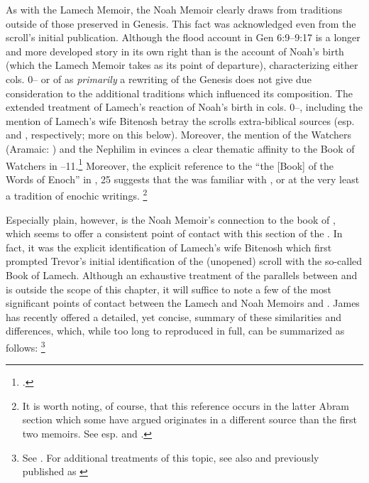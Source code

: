 As with the Lamech Memoir, the Noah Memoir clearly draws from traditions outside of those preserved in Genesis. This fact was acknowledged even from the scroll's initial publication.\autocite[38]{avigad-yadin1956} Although the flood account in Gen 6:9--9:17 is a longer and more developed story in its own right than is the account of Noah's birth (which the Lamech Memoir takes as its point of departure), characterizing either cols. 0-- or  of \ga as \emph{primarily} a rewriting of the Genesis does not give due consideration to the additional traditions which influenced its composition. The extended treatment of Lamech's reaction of Noah's birth in cols. 0--, including the mention of Lamech's wife Bitenosh betray the scrolls extra-biblical sources (esp. \firstenoch and \jub, respectively; more on this below). Moreover, the mention of the Watchers (Aramaic: ) and the Nephilim in  evinces a clear thematic affinity to the Book of Watchers in --11.\footnote{\cite[174]{nickelsburg2005}.} Moreover, the explicit reference to the ``the [Book] of the Words of Enoch'' in , 25 suggests that the \ga was familiar with \firstenoch, or at the very least a tradition of enochic writings.%
%
\footnote{It is worth noting, of course, that this reference occurs in the latter Abram section which some have argued originates in a different source than the first two memoirs. See esp. \cite{bernstein_berthelot-etal2010} and \cite{bernstein_as2010}.}

Especially plain, however, is the Noah Memoir's connection to the book of \jub, which seems to offer a consistent point of contact with this section of the \ga.\autocite[20]{fitzmyer2004} In fact, it was the explicit identification of Lamech's wife Bitenosh which first prompted Trevor's initial identification of the (unopened) scroll with the so-called Book of Lamech.\autocite{trevor_basor1949} Although an exhaustive treatment of the parallels between \jub and \ga is outside the scope of this chapter, it will suffice to note a few of the most significant points of contact between the Lamech and Noah Memoirs and \jub. James \vanderkam has recently offered a detailed, yet concise, summary of these similarities and differences, which, while too long to reproduced in full, can be summarized as follows:%
\footnote{See \cite[374--376]{vanderkam_feldman-etal2017}. For additional treatments of this topic, see also \cite{machiela2009} and \cite[305--342]{kugel2012} previously published as \cite{kugel_roitman-etal2011}} 

